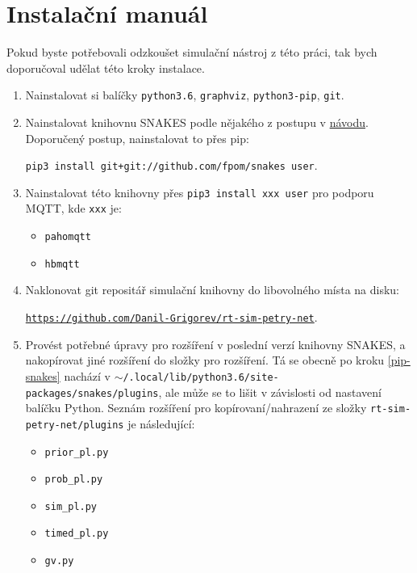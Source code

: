

\chapter{Instalační manuál}

Pokud byste potřebovali odzkoušet simulační nástroj z této práci, tak bych doporučoval udělat této kroky instalace.
\begin{enumerate}
    \item Nainstalovat si balíčky \texttt{python3.6}, \texttt{graphviz}, \texttt{python3-pip}, \texttt{git}.
    \item Nainstalovat knihovnu SNAKES podle nějakého z postupu v \href{https://www.ibisc.univ-evry.fr/~fpommereau/SNAKES/first-steps-with-snakes.html}{návodu}. \label{pip-snakes}
    Doporučený postup, nainstalovat to přes pip:

    \texttt{pip3 install git+git://github.com/fpom/snakes \-\-user}.
    \item Nainstalovat této knihovny přes \texttt{pip3 install xxx \-\-user} pro podporu MQTT, kde \texttt{xxx} je:
    \begin{itemize}
        \item \texttt{pahomqtt}
        \item \texttt{hbmqtt}
    \end{itemize}
    \item Naklonovat git repositář simulační knihovny do libovolného místa na disku:

    \href{https://github.com/Danil-Grigorev/rt-sim-petry-net}{\texttt{https://github.com/Danil-Grigorev/rt-sim-petry-net}}.
    \item Provést potřebné úpravy pro rozšíření  v poslední verzí knihovny SNAKES, a nakopírovat jiné rozšíření do složky pro rozšíření. Tá se obecně po kroku \ref{pip-snakes} nachází v \texttt{$\sim$/.local/lib/python3.6/site-packages/snakes/plugins}, ale může se to lišit v závislosti od nastavení balíčku Python. Seznám rozšíření pro kopírovaní/nahrazení ze složky \texttt{rt-sim-petry-net/plugins} je následující:
    \begin{itemize}
        \item \texttt{prior\_pl.py}
        \item \texttt{prob\_pl.py}
        \item \texttt{sim\_pl.py}
        \item \texttt{timed\_pl.py}
        \item \texttt{gv.py}
    \end{itemize}

\end{enumerate}
